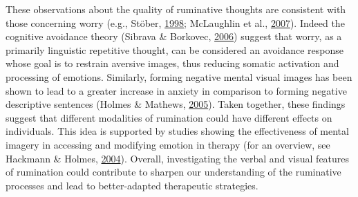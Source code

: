 \documentclass[a4paper,12pt,twoside,openright,oldfontcommands,final]{memoir}
\begin{document}
These observations about the quality of ruminative thoughts are consistent with those concerning worry (e.g., Stöber, \protect\hyperlink{ref-stober_worry_1998}{1998}; McLaughlin et al., \protect\hyperlink{ref-mclaughlin_effects_2007}{2007}). Indeed the cognitive avoidance theory (Sibrava \& Borkovec, \protect\hyperlink{ref-davey_cognitive_2006}{2006}) suggest that worry, as a primarily linguistic repetitive thought, can be considered an avoidance response whose goal is to restrain aversive images, thus reducing somatic activation and processing of emotions. Similarly, forming negative mental visual images has been shown to lead to a greater increase in anxiety in comparison to forming negative descriptive sentences (Holmes \& Mathews, \protect\hyperlink{ref-holmes_mental_2005}{2005}). Taken together, these findings suggest that different modalities of rumination could have different effects on individuals. This idea is supported by studies showing the effectiveness of mental imagery in accessing and modifying emotion in therapy (for an overview, see Hackmann \& Holmes, \protect\hyperlink{ref-hackmann_reflecting_2004}{2004}). Overall, investigating the verbal and visual features of rumination could contribute to sharpen our understanding of the ruminative processes and lead to better-adapted therapeutic strategies.
\end{document}

